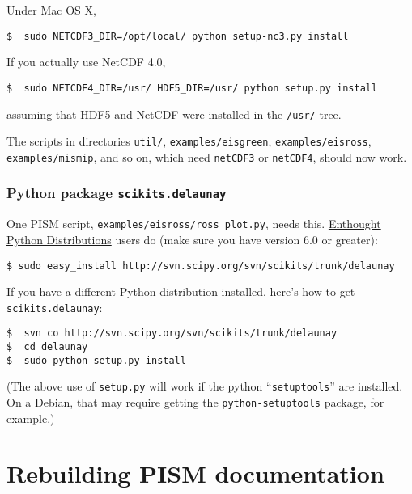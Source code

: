 \documentclass[11pt,final]{amsart}
\begin{document}
Under Mac OS X,
\begin{verbatim}
$  sudo NETCDF3_DIR=/opt/local/ python setup-nc3.py install
\end{verbatim}

If you actually use NetCDF 4.0,
\begin{verbatim}
$  sudo NETCDF4_DIR=/usr/ HDF5_DIR=/usr/ python setup.py install
\end{verbatim}%
assuming that HDF5 and NetCDF were installed in the \texttt{/usr/} tree.

The scripts in directories \texttt{util/}, \texttt{examples/eisgreen}, \texttt{examples/eisross}, \texttt{examples/mismip}, and so
on, which need \texttt{netCDF3} or \texttt{netCDF4}, should now work.


\subsubsection*{Python package \texttt{scikits.delaunay}}  One PISM script, \texttt{examples/eisross/ross_plot.py}, needs this. \href{http://www.enthought.com/}{Enthought Python Distributions} users do (make sure you have version 6.0 or greater): 
\begin{verbatim}
$ sudo easy_install http://svn.scipy.org/svn/scikits/trunk/delaunay
\end{verbatim}
If you have a different Python distribution installed, here's how to get \texttt{scikits.delaunay}:
\begin{verbatim}
$  svn co http://svn.scipy.org/svn/scikits/trunk/delaunay
$  cd delaunay
$  sudo python setup.py install
\end{verbatim}
(The above use of \texttt{setup.py} will work if the python ``\texttt{setuptools}'' are installed.  On a Debian, that may require getting the \texttt{python-setuptools} package, for example.)

\newpage
\section{Rebuilding PISM documentation}
\label{sec:docs}
\end{document}

